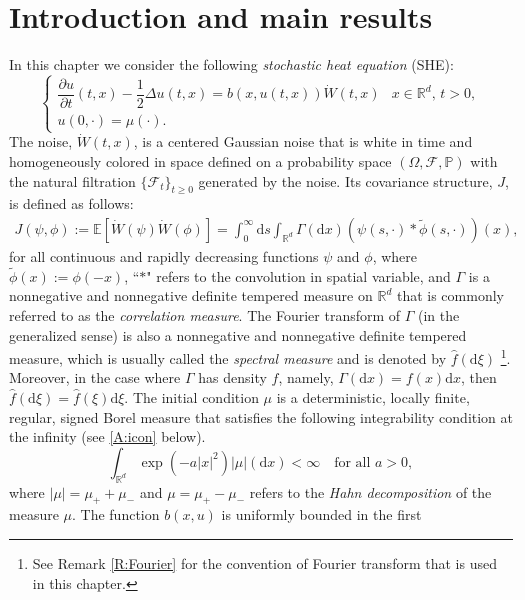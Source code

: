 \documentclass[12pt]{report}
\theoremstyle{plain}
\theoremstyle{definition}
\numberwithin{equation}{section}
\newcommand{\R}{\mathbb{R}}
\newcommand{\E}{\mathbb{E}}
\newcommand{\ud}{\ensuremath{ \mathrm{d} }}
\begin{document}
\section{Introduction and main results}
In this chapter we consider the following {\it stochastic heat equation} (SHE):
\begin{equation} \label{E:SHE}
\begin{cases}
\dfrac{\partial u}{\partial t}(t,x)-\dfrac{1}{2}\Delta u(t,x) = b(x,u(t,x))\dot W(t,x) & \text{$x\in \R^d$, $t>0$}, \\
u(0,\cdot) = \mu(\cdot).
\end{cases}
\end{equation}
The noise, $\dot{W}(t,x)$, is a centered Gaussian noise that is white in time and homogeneously
colored in space defined on a probability space $(\Omega, \mathcal{F}, \mathbb{P})$ with the natural
filtration $\{ \mathcal{F}_t \}_{t\ge 0}$ generated by the noise. Its covariance structure, $J$, is
defined as follows:
\begin{align} \label{E:Cor}
J(\psi,\phi) := \E \left[ \dot{W}\left(\psi\right)\dot{W}\left(\phi\right) \right]
= \int_0^\infty \ud s \int_{\R^d} \Gamma(\ud x)(\psi(s,\cdot)*\widetilde{\phi}(s,\cdot))(x),
\end{align}
for all continuous and rapidly decreasing functions $\psi$ and $\phi$, where $\widetilde{\phi}(x) :=
\phi(-x)$, ``$*$" refers to the convolution in spatial variable, and $\Gamma$ is a nonnegative and
nonnegative definite tempered measure on $\R^d$ that is commonly referred to as the {\it correlation
	measure}. The Fourier transform of $\Gamma$ (in the generalized sense) is also a nonnegative and
nonnegative definite tempered measure, which is usually called the {\it spectral measure} and is
denoted by $\widehat{f}(\ud \xi)$ \footnote{See Remark \ref{R:Fourier} for the convention of Fourier
	transform that is used in this chapter.}. Moreover, in the case where $\Gamma$ has density $f$,
namely, $\Gamma(\ud x)=f(x) \ud x$, then $\widehat{f}(\ud \xi) = \widehat{f}(\xi) \ud \xi$. The
initial condition $\mu$ is a deterministic, locally finite, regular, signed Borel measure that
satisfies the following integrability condition at the infinity (see \eqref{A:icon} below).
\begin{equation*} 
\int_{\R^d}\exp\left(-a|x|^2\right) |\mu|(\ud x) < \infty \quad \text{for all $a>0$},
\end{equation*}
where $|\mu|=\mu_++\mu_-$ and $\mu=\mu_+-\mu_-$ refers to the {\it Hahn decomposition} of the measure
$\mu$. The function $b(x,u)$ is uniformly bounded in the first
\end{document}
